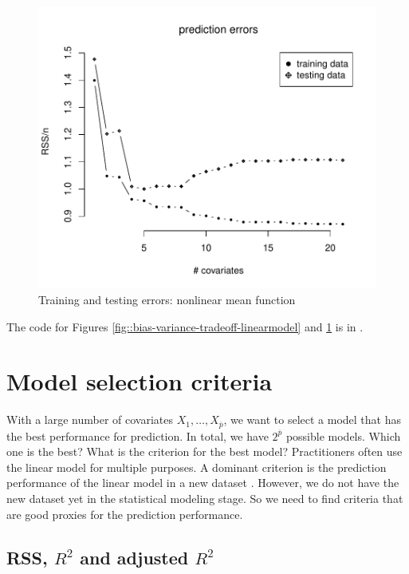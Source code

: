 \begin{figure}[th]
\centering 
\includegraphics[width = 0.8 \textwidth]{figures/training_testing_error_poly.pdf}
\caption{Training and testing errors: nonlinear mean function}\label{fig::bias-variance-tradeoff-linearmodel-poly}
\end{figure}
 

The  code for Figures \ref{fig::bias-variance-tradeoff-linearmodel} and \ref{fig::bias-variance-tradeoff-linearmodel-poly} is in . 



\section{Model selection criteria}

With a large number of covariates $X_{1},\ldots,X_{\overline{p}}$, we want to
select a model that has the best performance for prediction. In total,
we have $2^{\overline{p}}$ possible models. Which one is the best? What is the
criterion for the best model? Practitioners often use the linear model for multiple purposes. A dominant criterion is the prediction performance of the linear model in a new dataset \citep{yu2020veridical}.
However, we do not have the new dataset yet in the statistical modeling stage. So we need to find criteria that are good proxies for the prediction performance. 



\subsection{RSS, $R^{2}$ and adjusted $R^{2}$}

